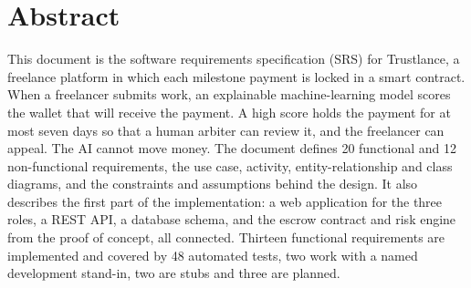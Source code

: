 \chapter*{Abstract}
This document is the software requirements specification (SRS) for Trustlance, a freelance platform in which each milestone payment is locked in a smart contract. When a freelancer submits work, an explainable machine-learning model scores the wallet that will receive the payment. A high score holds the payment for at most seven days so that a human arbiter can review it, and the freelancer can appeal. The AI cannot move money. The document defines 20 functional and 12 non-functional requirements, the use case, activity, entity-relationship and class diagrams, and the constraints and assumptions behind the design. It also describes the first part of the implementation: a web application for the three roles, a REST API, a database schema, and the escrow contract and risk engine from the proof of concept, all connected. Thirteen functional requirements are implemented and covered by 48 automated tests, two work with a named development stand-in, two are stubs and three are planned.
